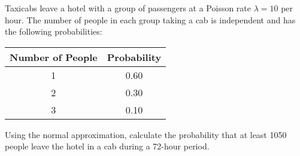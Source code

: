  Taxicabs leave a hotel with a group of passengers at a Poisson rate 
$\lambda =10$ per hour. The number
of people in each group taking a cab is independent and has the following 
probabilities:

\begin{center}\begin{tabular}{cc}
Number of People & Probability \\ \hline
1 & 0.60 \\
2 & 0.30 \\
3 & 0.10
\end{tabular}\end{center}

Using the normal approximation, calculate the probability that at least 
1050 people leave the hotel in a cab during a 72-hour period.
